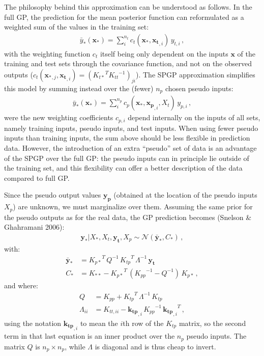 \documentclass[11pt,a4paper]{article}
\numberwithin{equation}{section}
\begin{document}
The philosophy behind this approximation can be understood as follows. In the full GP, the prediction for the mean posterior function can reformulated as a weighted sum of the values in the training set:
\begin{align}
\bar{y}_*(\mathbf{x_*}) = \sum_i^{n_t} c_{t}(\mathbf{x_*}, \mathbf{x_t}_{,i})\,y_{t,i}\,,
\end{align}
with the weighting function $c_{t}$ itself being only dependent on the inputs $\mathbf{x}$ of the training and test sets through the covariance function, and not on the observed outputs ($c_{t}(\mathbf{x_*}_{,j}, \mathbf{x_t}_{,i}) = ({K_{t*}}^T {K_{tt}}^{-1})_{ji}$). The SPGP approximation simplifies this model by summing instead over the (fewer) $n_p$ chosen pseudo inputs:
\begin{align}
\bar{y}_*(\mathbf{x_*}) = \sum_i^{n_p} c_{p}(\mathbf{x_*}, \mathbf{x_p}_{,i}, X_t)\,y_{p,i}\,,
\end{align}
were the new weighting coefficients $c_{p,i}$ depend internally on the inputs of all sets, namely training inputs, pseudo inputs, and test inputs. When using fewer pseudo inputs than training inputs, the sum above should be less flexible in prediction data. However, the introduction of an extra ``pseudo'' set of data is an advantage of the SPGP over the full GP: the pseudo inputs can in principle lie outside of the training set, and this flexibility can offer a better description of the data compared to full GP.

Since the pseudo output values $\mathbf{y_p}$ (obtained at the location of the pseudo inputs $X_p$) are unknown, we must marginalize over them. Assuming the same prior for the pseudo outputs as for the real data, the GP prediction becomes (Snelson \& Ghahramani 2006):
\begin{align}
\mathbf{y_*} | X_*, X_t, \mathbf{y_t}, X_p \sim \mathcal{N}(\mathbf{\bar{y}_*}, C_*)\,,
\end{align}
with:
\begin{align}
\mathbf{\bar{y}_*} &= {K_{p*}}^T\,Q^{-1}\,{K_{tp}}^T\,\Lambda^{-1}\,\mathbf{y_t}\, \\
C_* &= K_{**} - {K_{p*}}^T\,({K_{pp}}^{-1} - Q^{-1})\,K_{p*}\,,
\end{align}
and where:
\begin{align}
Q &= K_{pp} + {K_{tp}}^T\,\Lambda^{-1}\,K_{tp}\, \\
\Lambda_{ii} &= K_{tt,ii} - \mathbf{k_{tp}}_{,i}\,{K_{pp}}^{-1}\,{\mathbf{k_{tp}}_{,i}}^T \,,
\end{align}
using the notation $\mathbf{k_{tp}}_{,i}$ to mean the $i$th row of the $K_{tp}$ matrix, so the second term in that last equation is an inner product over the $n_p$ pseudo inputs. The matrix $Q$ is $n_p \times n_p$, while $\Lambda$ is diagonal and is thus cheap to invert.
\end{document}
